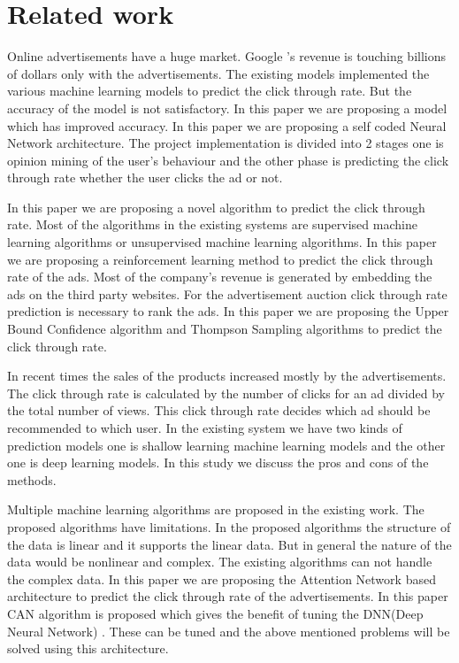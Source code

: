 \documentclass[conference]{IEEEtran}
\begin{document}
\section {Related work}
Online advertisements have a huge market. Google 's revenue is touching billions of dollars only with the advertisements. The existing models implemented the various machine learning models to predict the click through rate. But the accuracy of the model is not satisfactory. In this paper we are proposing a model which has improved accuracy. In this paper we are proposing a self coded Neural Network architecture. The project implementation is divided into 2 stages one is opinion mining of the user’s behaviour and the other phase is predicting the click through rate whether the user clicks the ad or not\cite{9832264}.

In this paper we are proposing a novel algorithm to predict the click through rate. Most of the algorithms in the existing systems are supervised machine learning algorithms or unsupervised machine learning algorithms. In this paper we are proposing a reinforcement learning method to predict the click through rate of the ads. Most of the company's revenue is generated by embedding the ads on the third party websites. For the advertisement auction click through rate prediction is necessary to rank the ads. In this paper we are proposing the Upper Bound Confidence algorithm and Thompson Sampling algorithms to predict the click through rate\cite{9616653}.

In recent times the sales of the products increased mostly by the advertisements. The click through rate is calculated by the number of clicks for an ad divided by the total number of views. This click through rate decides which ad should be recommended to which user. In the existing system we have two kinds of prediction models one is shallow learning machine learning models and the other one is deep learning models. In this study we discuss the pros and cons of the methods\cite{9277337}.

Multiple machine learning algorithms are proposed in the existing work. The proposed algorithms have limitations. In the proposed algorithms the structure of the data is linear and it supports the linear data. But in general the nature of the data would be nonlinear and complex. The existing algorithms can not handle the complex data. In this paper we are proposing the Attention Network based architecture to predict the click through rate of the advertisements. In this paper CAN algorithm is proposed which gives the benefit of tuning the DNN(Deep Neural Network) . These can be tuned and the above mentioned problems will be solved using this architecture\cite{9515791}.
\end{document}
